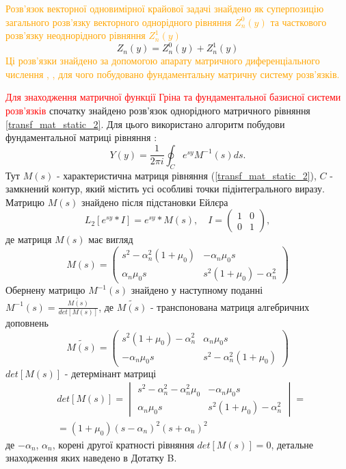 \textcolor{orange}
{
Розв'язок векторної одновимірної крайової задачі знайдено як суперпозицію загального розв'язку векторного однорідного рівняння $Z_n^0(y)$
та часткового розв'язку неоднорідного рівняння $Z_n^1(y)$
}
\begin{equation}
    Z_n(y) = Z_n^0(y) + Z_n^1(y)
\end{equation}
\textcolor{orange}
{
Ці розв'язки знайдено за допомогою апарату матричного диференціального числення \cite{popov_4}, \cite{gantmaher},
для чого побудовано фундаментальну матричну систему розв'язків.
}

\textcolor{red}{Для знаходження матричної функції Гріна та фундаментальної базисної системи розв'язків}
спочатку знайдено розв'язок однорідного матричного рівняння \eqref{transf_mat_static_2}.
Для цього використано алгоритм побудови фундаментальної матриці рівняння \cite{gantmaher}:
\begin{equation}
    Y(y) = \frac{1}{2\pi i} \oint_C e^{sy} M^{-1}(s)ds.
\end{equation}
Тут $M(s)$ - характеристична матриця рівняння (\ref{transf_mat_static_2}), $C$ - замкнений контур, який містить усі особливі точки підінтегрального виразу.
Матрицю $M(s)$ знайдено після підстановки Ейлєра
\begin{equation}
    L_2\left[ e^{sy}*I \right] = e^{sy} * M(s), \quad I = \begin{pmatrix} 1 & 0 \\ 0 & 1 \end{pmatrix},
\end{equation}
де матриця $M(s)$ має вигляд
\begin{equation}
    M(s) = \begin{pmatrix}
        s^2 -\alpha_n^2(1 + \mu_0) & -\alpha_n \mu_0 s \\
        \alpha_n \mu_0 s & s^2 (1 + \mu_0) -\alpha_n^2
     \end{pmatrix}
\end{equation}
Обернену матрицю $M^{-1}(s)$ знайдено у наступному поданні $M^{-1}(s) = \frac{\widetilde{M(s)}}{det[M(s)]}$, 
де $\widetilde{M(s)}$ - транспонована матриця алгебричних доповнень
\begin{equation}
    \widetilde{M(s)} = \begin{pmatrix}
        s^2 (1 + \mu_0) -\alpha_n^2 & \alpha_n \mu_0 s \\
        -\alpha_n \mu_0 s & s^2 -\alpha_n^2(1 + \mu_0)
     \end{pmatrix}
\end{equation}
$det[M(s)]$ - детермінант матриці
\begin{align}
    &det[M(s)] = \begin{vmatrix}
        s^2 - \alpha_n^2 - \alpha_n^2\mu_0 & -\alpha_n \mu_0 s \\
        \alpha_n \mu_0 s & s^2 (1 + \mu_0) -\alpha_n^2
     \end{vmatrix} = \nonumber \\
    &=(1+\mu_0)(s - \alpha_n)^2(s + \alpha_n)^2
\end{align}
де $-\alpha_n$, $\alpha_n$, корені другої кратності рівняння $det[M(s)]=0$, детальне знаходження яких наведено в Дотатку B.

